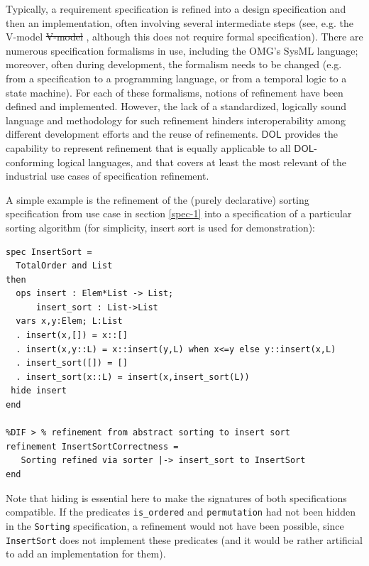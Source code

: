 \documentclass[10pt,fleqn,final]{scrreprt}
\newcommand*{\DOL}{\ensuremath{\mathsf{DOL}}\xspace}
\providecommand{\DIFadd}[1]{{\protect\color{blue}\uwave{#1}}} %
\providecommand{\DIFdel}[1]{{\protect\color{red}\sout{#1}}}                      %
\providecommand{\DIFaddbegin}{} %
\providecommand{\DIFaddend}{} %
\providecommand{\DIFdelbegin}{} %
\providecommand{\DIFdelend}{} %
\begin{document}
Typically, a requirement specification is refined into a
design specification and then an implementation, often involving
several intermediate steps (see, e.g. the V-model\DIFdelbegin %
\DIFdel{V-model}%
\DIFdelend \DIFaddbegin \DIFadd{~\mbox{%
\cite{V-model}
}%
}\DIFaddend , although
this does not require formal specification).  There are numerous
specification formalisms in use, including the OMG's SysML language;
moreover, often during development, the formalism needs to be changed
(e.g. from a specification to a programming language, or from a
temporal logic to a state machine). For each of these formalisms,
notions of refinement have been defined and implemented. However, the
lack of a standardized, logically sound language and methodology for
such refinement hinders interoperability among different development
efforts and the reuse of refinements.  \DOL provides the capability to
represent refinement that is equally applicable to all \DOL-conforming
logical languages, and that covers at least the most relevant of the
industrial use cases of specification refinement.

A simple example is the refinement of the (purely declarative) sorting
specification from use case in section \ref{spec-1} into a specification of a particular sorting
algorithm (for simplicity, insert sort is used for demonstration):

\begin{lstlisting}[basicstyle=\ttfamily\footnotesize,language=dolText,alsolanguage=CASL,escapechar=@,mathescape]	
spec InsertSort = 
  TotalOrder and List
then
  ops insert : Elem*List -> List;
      insert_sort : List->List
  vars x,y:Elem; L:List
  . insert(x,[]) = x::[]
  . insert(x,y::L) = x::insert(y,L) when x<=y else y::insert(x,L)
  . insert_sort([]) = []
  . insert_sort(x::L) = insert(x,insert_sort(L))
 hide insert
end

%DIF > % refinement from abstract sorting to insert sort
refinement InsertSortCorrectness =
   Sorting refined via sorter |-> insert_sort to InsertSort
end
\end{lstlisting}
Note that hiding is essential here to make the signatures of
both specifications compatible. If  the
predicates \texttt{is\_ordered} and \texttt{permutation}
had not been hidden in the \texttt{Sorting} specification, a refinement would
not have been possible, since \texttt{InsertSort} does not
implement these predicates (and it would be rather artificial
to add an implementation for them).
\end{document}
